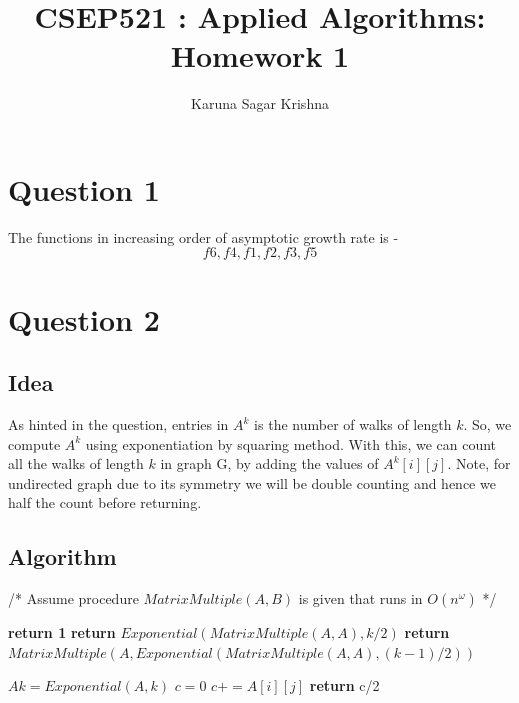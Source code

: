 \documentclass{article}
\title{CSEP521 : Applied Algorithms: Homework 1}
\author{Karuna Sagar Krishna}
\begin{document}
\maketitle

\section*{Question 1}
The functions in increasing order of asymptotic growth rate is - \[ f6, f4, f1, f2, f3, f5 \]

\section*{Question 2}

\subsection*{Idea}
As hinted in the question, entries in \(A^k\) is the number of walks of length \(k\). So, we compute \(A^k\) using exponentiation by squaring method. With this, we can count all the walks of length \(k\) in graph G, by adding the values of \(A^k[i][j]\). Note, for undirected graph due to its symmetry we will be double counting and hence we half the count before returning.

\subsection*{Algorithm}
\begin{algorithm}
/* Assume procedure $MatrixMultiple(A, B)$ is given that runs in $O(n^\omega)$ */
\begin{algorithmic}
        \State \textbf{return 1}
    \EndIf
        \State \textbf{return} $Exponential(MatrixMultiple(A, A), k/2)$
    \EndIf
        \State \textbf{return} $MatrixMultiple(A, Exponential(MatrixMultiple(A, A), (k-1)/2))$
    \EndIf
\EndProcedure
\end{algorithmic}
\end{algorithm}

\begin{algorithm}
\begin{algorithmic}
    \State $Ak = Exponential(A, k)$
    \State $c = 0$
            \State $c += A[i][j]$
        \EndFor
    \EndFor
    \State \textbf{return} c/2
\EndProcedure
\end{algorithmic}
\end{algorithm}
\end{document}
